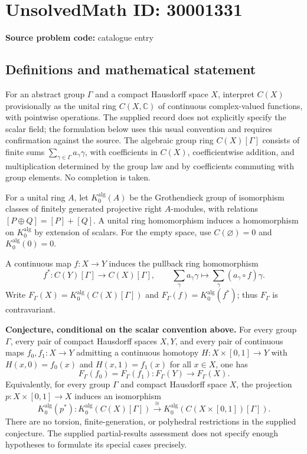 \documentclass[11pt]{article}
\newcommand{\C}{\mathbb{C}}
\begin{document}
\section*{UnsolvedMath ID: 30001331}
\textbf{Source problem code:} catalogue entry
\subsection{Definitions and mathematical statement}
For an abstract group \(\Gamma\) and a compact Hausdorff space \(X\), interpret \(C(X)\) provisionally as the unital ring \(C(X,\C)\) of continuous complex-valued functions, with pointwise operations. The supplied record does not explicitly specify the scalar field; the formulation below uses this usual convention and requires confirmation against the source. The algebraic group ring \(C(X)[\Gamma]\) consists of finite sums \(\sum_{\gamma\in\Gamma}a_\gamma\gamma\), with coefficients in \(C(X)\), coefficientwise addition, and multiplication determined by the group law and by coefficients commuting with group elements. No completion is taken.

For a unital ring \(A\), let \(K_0^{\mathrm{alg}}(A)\) be the Grothendieck group of isomorphism classes of finitely generated projective right \(A\)-modules, with relations \([P\oplus Q]=[P]+[Q]\). A unital ring homomorphism induces a homomorphism on \(K_0^{\mathrm{alg}}\) by extension of scalars. For the empty space, use \(C(\varnothing)=0\) and \(K_0^{\mathrm{alg}}(0)=0\).

A continuous map \(f\colon X\to Y\) induces the pullback ring homomorphism
\[
 f^*\colon C(Y)[\Gamma]\longrightarrow C(X)[\Gamma],\qquad
 \sum_\gamma a_\gamma\gamma\longmapsto
 \sum_\gamma(a_\gamma\circ f)\gamma.
\]
Write \(F_\Gamma(X)=K_0^{\mathrm{alg}}(C(X)[\Gamma])\) and \(F_\Gamma(f)=K_0^{\mathrm{alg}}(f^*)\); thus \(F_\Gamma\) is contravariant.

\textbf{Conjecture, conditional on the scalar convention above.} For every group \(\Gamma\), every pair of compact Hausdorff spaces \(X,Y\), and every pair of continuous maps \(f_0,f_1\colon X\to Y\) admitting a continuous homotopy \(H\colon X\times[0,1]\to Y\) with \(H(x,0)=f_0(x)\) and \(H(x,1)=f_1(x)\) for all \(x\in X\), one has
\[
 F_\Gamma(f_0)=F_\Gamma(f_1)\colon F_\Gamma(Y)\longrightarrow F_\Gamma(X).
\]
Equivalently, for every group \(\Gamma\) and compact Hausdorff space \(X\), the projection \(p\colon X\times[0,1]\to X\) induces an isomorphism
\[
 K_0^{\mathrm{alg}}(p^*)\colon
 K_0^{\mathrm{alg}}(C(X)[\Gamma])
 \xrightarrow{\ \cong\ }
 K_0^{\mathrm{alg}}(C(X\times[0,1])[\Gamma]).
\]
There are no torsion, finite-generation, or polyhedral restrictions in the supplied conjecture. The supplied partial-results assessment does not specify enough hypotheses to formulate its special cases precisely.
\end{document}
